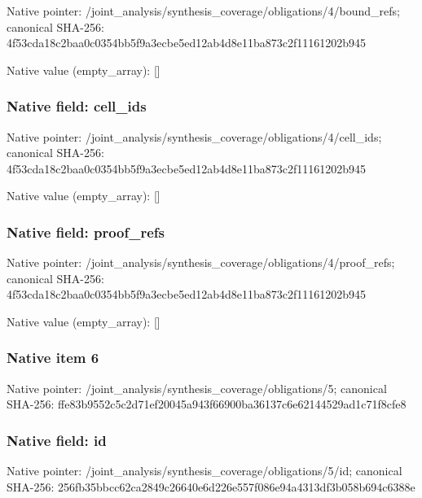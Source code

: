 \documentclass[10pt,a4paper]{article}
\begin{document}
Native pointer: /joint\_analysis/synthesi\allowbreak{}s\_coverage/obligations/4\allowbreak{}/bound\_refs; canonical SHA-256: 4f53cda18c2baa0c0354bb5f\allowbreak{}9a3ecbe5ed12ab4d8e11ba87\allowbreak{}3c2f11161202b945



Native value (empty\_array): []



\subsubsection{Native field: cell\_ids}


Native pointer: /joint\_analysis/synthesi\allowbreak{}s\_coverage/obligations/4\allowbreak{}/cell\_ids; canonical SHA-256: 4f53cda18c2baa0c0354bb5f\allowbreak{}9a3ecbe5ed12ab4d8e11ba87\allowbreak{}3c2f11161202b945



Native value (empty\_array): []



\subsubsection{Native field: proof\_refs}


Native pointer: /joint\_analysis/synthesi\allowbreak{}s\_coverage/obligations/4\allowbreak{}/proof\_refs; canonical SHA-256: 4f53cda18c2baa0c0354bb5f\allowbreak{}9a3ecbe5ed12ab4d8e11ba87\allowbreak{}3c2f11161202b945



Native value (empty\_array): []



\subsubsection{Native item 6}


Native pointer: /joint\_analysis/synthesi\allowbreak{}s\_coverage/obligations/5; canonical SHA-256: ffe83b9552c5c2d71ef20045\allowbreak{}a943f66900ba36137c6e6214\allowbreak{}4529ad1c71f8cfe8



\subsubsection{Native field: id}


Native pointer: /joint\_analysis/synthesi\allowbreak{}s\_coverage/obligations/5\allowbreak{}/id; canonical SHA-256: 256fb35bbcc62ca2849c2664\allowbreak{}0e6d226e557f086e94a4313d\allowbreak{}f3b058b694c6388e
\end{document}
